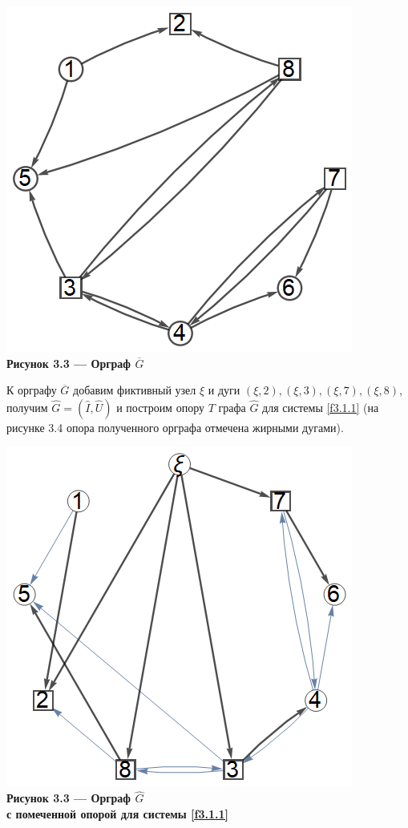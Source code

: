 \documentclass[14pt]{extarticle}%
\begin{document}
\begin{center}
\includegraphics[scale=0.6]{grs/s1overg.png}\\
\textbf{Рисунок 3.3 --- Орграф $\overline{G}$}
\end{center}

К орграфу $\overline{G}$ добавим фиктивный узел $\xi$ и дуги $(\xi, 2),(\xi,3),(\xi,7), (\xi,8)$, получим $\widehat{G}=(\widehat{I},\widehat{U})$ и построим опору $T$ графа $\widehat{G}$ для системы \eqref{f3.1.1} (на рисунке 3.4 опора полученного орграфа отмечена жирными дугами). 

\begin{center}
\includegraphics[scale=0.6]{grs/s1ghat.png}\\
\textbf{Рисунок 3.3 --- Орграф $\widehat{G}$ \\с помеченной опорой для системы \eqref{f3.1.1}}
\end{center}
\end{document}
